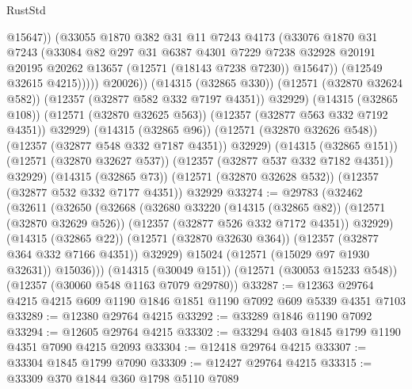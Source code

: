 \begin{lexlean}{RustStd}
\begin{coremodule}
                          @15647))
                      (@33055
                        @1870
                        @382
                        @31
                        @11
                        @7243
                        @4173
                        (@33076
                          @1870
                          @31
                          @7243
                          (@33084
                            @82
                            @297
                            @31
                            @6387
                            @4301
                            @7229
                            @7238
                            @32928
                            @20191
                            @20195
                            @20262
                            @13657
                            (@12571 (@18143 @7238 @7230))
                            @15647))
                        (@12549 @32615 @4215)))))
                @20026))
            (@14315 (@32865 @330))
            (@12571 (@32870 @32624 @582))
            (@12357 (@32877 @582 @332 @7197 @4351))
            @32929)
          (@14315 (@32865 @108))
          (@12571 (@32870 @32625 @563))
          (@12357 (@32877 @563 @332 @7192 @4351))
          @32929)
        (@14315 (@32865 @96))
        (@12571 (@32870 @32626 @548))
        (@12357 (@32877 @548 @332 @7187 @4351))
        @32929)
      (@14315 (@32865 @151))
      (@12571 (@32870 @32627 @537))
      (@12357 (@32877 @537 @332 @7182 @4351))
      @32929)
    (@14315 (@32865 @73))
    (@12571 (@32870 @32628 @532))
    (@12357 (@32877 @532 @332 @7177 @4351))
    @32929
@33274 := @29783
    (@32462
      (@32611
        (@32650
          (@32668
            (@32680
              @33220
              (@14315 (@32865 @82))
              (@12571 (@32870 @32629 @526))
              (@12357 (@32877 @526 @332 @7172 @4351))
              @32929)
            (@14315 (@32865 @22))
            (@12571 (@32870 @32630 @364))
            (@12357 (@32877 @364 @332 @7166 @4351))
            @32929)
          @15024
          (@12571 (@15029 @97 @1930 @32631))
          @15036)))
    (@14315 (@30049 @151))
    (@12571 (@30053 @15233 @548))
    (@12357 (@30060 @548 @1163 @7079 @29780))
@33287 := @12363 @29764 @4215 @4215 @609 @1190 @1846 @1851 @1190 @7092 @609 @5339 @4351 @7103
@33289 := @12380 @29764 @4215
@33292 := @33289 @1846 @1190 @7092
@33294 := @12605 @29764 @4215
@33302 := @33294 @403 @1845 @1799 @1190 @4351 @7090 @4215 @2093
@33304 := @12418 @29764 @4215
@33307 := @33304 @1845 @1799 @7090
@33309 := @12427 @29764 @4215
@33315 := @33309 @370 @1844 @360 @1798 @5110 @7089

\end{coremodule}
\end{lexlean}
